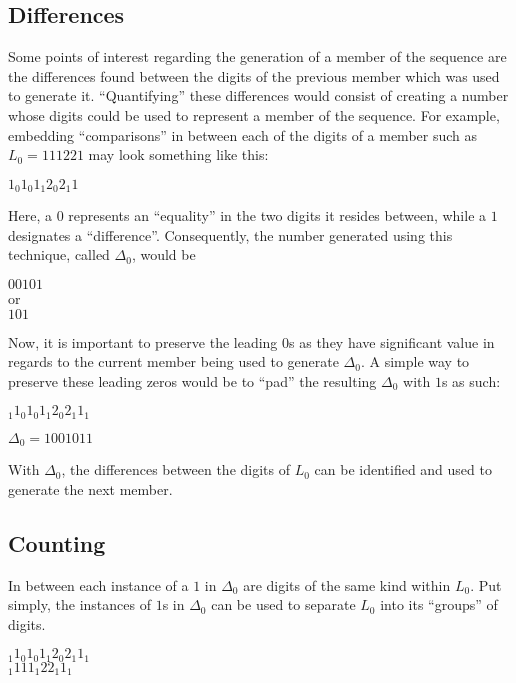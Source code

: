 \documentclass{article}
\begin{document}
	\subsection{Differences}
		Some points of interest regarding the generation of a member of the sequence are the
		differences found between the digits of the previous member which was used to generate it.
		``Quantifying'' these differences would consist of creating a number whose digits could 
		be used to represent a member of the sequence. For example, embedding ``comparisons'' in 
		between each of the digits of a member such as $L_0 = 111221$ may look something like this:
		\begin{center}
		${1}_0{1}_0{1}_1{2}_0{2}_1{1}$
		\end{center}
		Here, a $0$ represents an ``equality'' in the two digits it resides between,
		while a $1$ designates a ``difference''. Consequently, the number generated using this 
		technique, called $\Delta_0$, would be
		\begin{center}
		$00101$\\
		or\\
		$101$
		\end{center}
		Now, it is important to preserve the leading $0$s as they have significant value in 
		regards to the current member being used to generate $\Delta_0$. A simple way to preserve
		these leading zeros would be to ``pad'' the resulting $\Delta_0$ with $1$s as such:
		\begin{center}
		$_1{1}_0{1}_0{1}_1{2}_0{2}_1{1}_1$
		\end{center}
		\begin{center}
		$\Delta_0 = 1001011$
		\end{center}
		With $\Delta_0$, the differences between the digits of $L_0$ can be identified and used to 
		generate the next member.

		\subsection{Counting}
		In between each instance of a $1$ in $\Delta_0$ are digits of the same kind within $L_0$. 
		Put simply, the instances of $1$s in $\Delta_0$ can be used to separate $L_0$ into its 
		``groups'' of digits. 
		\begin{center}
		$_1{1}_0{1}_0{1}_1{2}_0{2}_1{1}_1$\\
		$_1{1}{1}{1}_1{2}{2}_1{1}_1$
		\end{center}

		\clearpage
\end{document}
